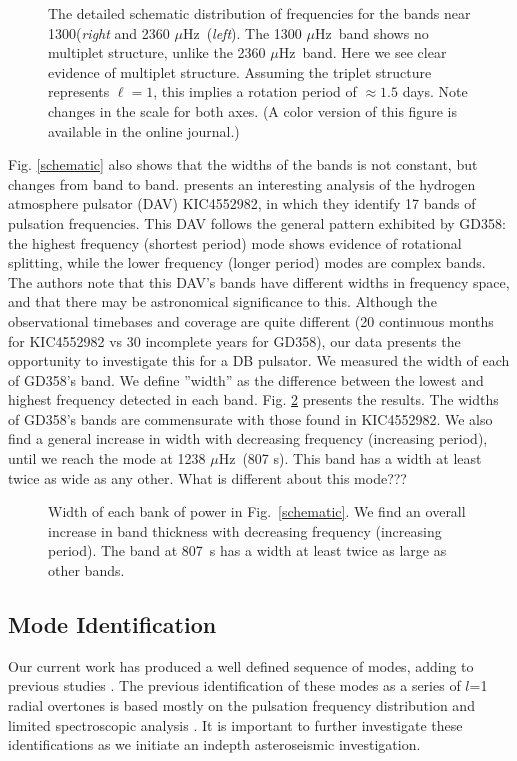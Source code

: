 \documentclass[12pt,preprint]{aastex}
\newcommand{\muHz}{\mbox{$\mu$Hz}}
\begin{document}
\begin{figure}
 \caption{The detailed schematic distribution of frequencies for the bands near 1300({\em{right}}
 and 2360 \muHz\ ({\em{left}}). The 1300 \muHz\ band shows no multiplet structure, unlike the 2360 \muHz\
 band. Here we see clear evidence of multiplet structure. Assuming the triplet structure represents
 $\ell=1$, this implies a rotation period of $\approx 1.5$ days. Note changes in the scale for both axes.
 (A color version of this figure is available in the online journal.)
 \label{rot}}
\end{figure}

Fig. \ref{schematic} also shows that the widths of the bands is not constant, but changes from band to band.
\citet{Bell15} presents an interesting analysis of the hydrogen atmosphere pulsator (DAV) KIC4552982, 
in which they identify 17 bands of pulsation frequencies. This DAV follows the general pattern exhibited 
by GD358: the highest frequency (shortest period) mode shows evidence of rotational splitting, while the 
lower frequency (longer period) modes are complex bands. The authors note that this DAV's bands have 
different widths in frequency space, and that there may be astronomical significance to this. Although the 
observational timebases and coverage are quite different (20 continuous months for KIC4552982 vs 30 
incomplete years for GD358), our data presents the opportunity to investigate this for a DB pulsator.  
We measured the width of each of GD358's band. We define ''width'' as the difference between the 
lowest and highest frequency detected in each band. Fig. \ref{thick} presents the results. 
The widths of GD358's bands are commensurate with those found in KIC4552982.  We also find a general 
increase in width with decreasing frequency (increasing period), until we reach 
the mode at 1238 \muHz\ (807 s). This band has a width at least twice as wide as any other.  What 
is different about this mode???

\begin{figure}
 \caption{Width of each bank of power in Fig.~\ref{schematic}. We find an overall increase 
 in band thickness with decreasing frequency (increasing period).  The band at 807~s has a width
 at least twice as large as other bands.  
 \label{thick}}
\end{figure}


\subsection{Mode Identification}
Our current work has produced a well defined sequence of modes, adding to previous studies \citep{Montgomery10, Provencal09, Metcalfe00, Winget94}. The previous identification of these modes as 
a series of $l$=1 radial overtones is based mostly on the pulsation frequency distribution 
and limited spectroscopic analysis \citep{Kotak02, Castanheira05}. It is important to further 
investigate these identifications as we initiate an indepth asteroseismic investigation.  
\end{document}
